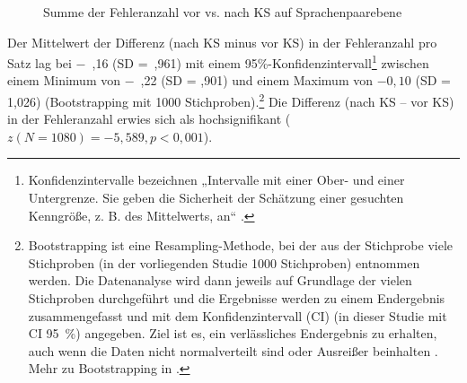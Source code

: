 
\begin{figure}
	\caption{\label{fig:05:11} Summe der Fehleranzahl vor vs. nach KS auf Sprachenpaarebene}
\end{figure}

%



  Der Mittelwert der Differenz (nach KS minus vor KS) in der Fehleranzahl pro Satz lag bei $-$~,16 (SD =~,961) mit einem 95\%-Konfidenzintervall\footnote{\textrm{Konfidenzintervalle bezeichnen „Intervalle mit einer Ober- und einer Untergrenze. Sie geben die Sicherheit der Schätzung einer gesuchten Kenngröße, z. B. des Mittelwerts, an“ \citep{Keller2015}.}} zwischen einem Minimum von $-$~,22 (SD = ,901) und einem Maximum von $- 0,10$ (SD = 1,026) (Bootstrapping mit 1000 Stichproben).\footnote{\textrm{Bootstrapping ist eine Resampling-Methode, bei der aus der Stichprobe viele Stichproben (in der vorliegenden Studie 1000 Stichproben) entnommen werden. Die Datenanalyse wird dann jeweils auf Grundlage der vielen Stichproben durchgeführt und die Ergebnisse werden zu einem Endergebnis zusammengefasst und mit dem Konfidenzintervall (CI) (in dieser Studie mit CI 95~\%) angegeben. Ziel ist es, ein verlässliches Endergebnis zu erhalten, auch wenn die Daten nicht normalverteilt sind oder Ausreißer beinhalten \citep{Keller2019}. Mehr zu Bootstrapping in \citet{Chernick2008}.}} Die Differenz (nach KS $–$ vor KS) in der Fehleranzahl erwies sich als hochsignifikant ($z (N = 1080) = - 5,589, p < 0,001$).


